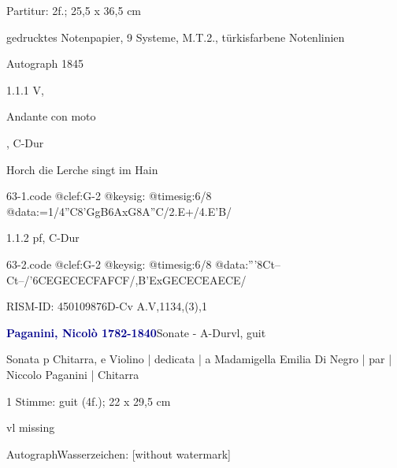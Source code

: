\documentclass[a4paper, twocolumn, 11pt]{book}
\begin{document}
\par \textcolor{darkblue}{}  Partitur: 2f.; 25,5 x 36,5 cm\newline \begin{small} gedrucktes Notenpapier,  9 Systeme, {\textquotedbl}M.T.2.{\textquotedbl}, türkisfarbene Notenlinien\end{small} \newline Autograph  1845
\par 1.1.1  V, \begin{itshape}Andante con moto\end{itshape}, C-Dur\newline \begin{footnotesize} Horch die Lerche singt im Hain \end{footnotesize}  
\begin{filecontents*}{63-1.code}
@clef:G-2
@keysig:
@timesig:6/8
@data:=1/4''C8'GgB6AxG8A''C/2.E+/4.E'B/
\end{filecontents*}
\newline %
\par 1.1.2  pf, C-Dur  
\begin{filecontents*}{63-2.code}
@clef:G-2
@keysig:
@timesig:6/8
@data:'''8Ct--Ct--/'{6CEGECE}{CFAFCF}/{,B'ExGECE}{CEAECE}/
\end{filecontents*}
\newline %
\par RISM-ID: 450109876\newline D-Cv  A.V,1134,(3),1
\par \vspace{16pt} \textcolor{darkblue}{\textbf{Paganini, Nicolò  1782-1840}}\hfillplus{[64]}\newline Sonate - A-Dur\newline vl, guit
\par \begin{itshape} Sonata p Chitarra, e Violino | dedicata | a Madamigella Emilia Di Negro | par | Niccolo Paganini | Chitarra\end{itshape} 
\par \textcolor{darkblue}{}  1 Stimme: guit  (4f.); 22 x 29,5 cm\newline \begin{small} vl missing\end{small} \newline Autograph\newline Wasserzeichen: [without watermark]
\end{document}
